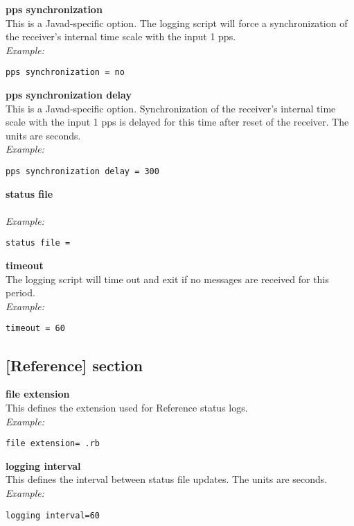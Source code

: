 {\bfseries pps synchronization}\\
This is a Javad-specific option. The logging script will force a synchronization of the receiver's
internal time scale with the input 1 pps.\\
\textit{Example:}
\begin{lstlisting}
pps synchronization = no
\end{lstlisting}

{\bfseries pps synchronization delay}\\
This is a Javad-specific option. Synchronization of the receiver's
internal time scale with the input 1 pps is delayed for this time after reset of the receiver.
The units are seconds.\\
\textit{Example:}
\begin{lstlisting}
pps synchronization delay = 300
\end{lstlisting}

{\bfseries status file}\\
\\
\textit{Example:}
\begin{lstlisting}
status file =
\end{lstlisting}

{\bfseries timeout}\\
The logging script will time out and exit if no messages are received for this period.\\
\textit{Example:}
\begin{lstlisting}
timeout = 60
\end{lstlisting}

\subsection{[Reference] section}

\hypertarget{h:reference}{}

{\bfseries file extension}\\
This defines the extension used for Reference status logs.\\
\textit{Example:}
\begin{lstlisting}
file extension= .rb
\end{lstlisting}

{\bfseries logging interval}\\
This defines the interval between status file updates. The units are seconds.\\
\textit{Example:}
\begin{lstlisting}
logging interval=60
\end{lstlisting}

